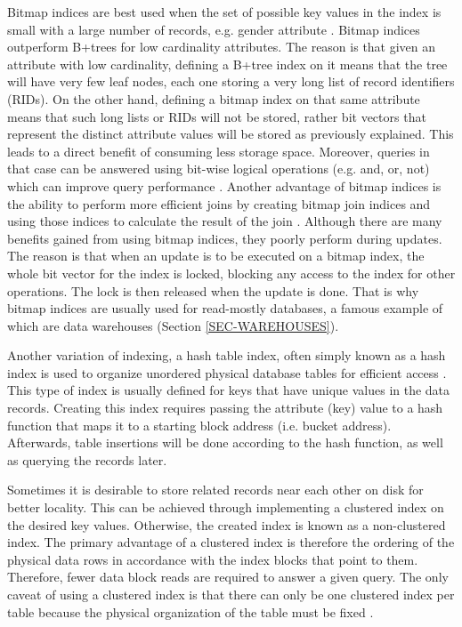 \documentclass[12pt,a4paper]{article}
\begin{document}
Bitmap indices are best used when the set of possible key values in the index is small with a large number of records, e.g. gender attribute
\cite{oneil1995multi}. Bitmap indices outperform B+trees for low cardinality attributes. The reason is that given an attribute with low cardinality, defining a
B+tree index
on it means that the tree will have very few leaf nodes, each one storing a very long list of record identifiers (RIDs). On the other hand, defining a
bitmap index on that same attribute means that such long lists or RIDs will not be stored, rather bit vectors that represent the distinct attribute values will
be stored as previously explained. This leads to a direct benefit of consuming less storage space. Moreover, queries in that case can be answered using bit-wise
logical operations (e.g. and, or, not) which can improve query performance \cite{oneil1997improved}. Another advantage of bitmap indices is the ability to
perform more
efficient joins by creating bitmap join indices and using those indices to calculate the result of the join \cite{oneil1995multi}. Although there are many
benefits
gained from using bitmap indices, they poorly perform during updates. The reason is that when an update is to be executed on a bitmap index, the whole bit
vector
for the index is locked, blocking any access to the index for other operations. The lock is then released when the update is done. That is why bitmap indices
are usually used for read-mostly databases, a famous example of which are data warehouses (Section \ref{SEC-WAREHOUSES}).

Another variation of indexing, a hash table index, often simply known as a hash index is used to organize unordered physical database tables for efficient
access \cite{lightstone2007physical}. This type of index is usually defined for keys that have unique values in the data records. Creating this index requires
passing the attribute (key) value to a hash function that maps it to a starting block address (i.e. bucket address). Afterwards, table insertions will be done
according to the hash function, as well as querying the records later.

Sometimes it is desirable to store related records near each other on disk for better locality. This can be achieved through implementing a clustered index on
the desired key values.
Otherwise, the created index is known as a non-clustered index. The primary advantage of a clustered index is therefore the ordering of the physical data rows
in accordance with the index blocks that point to them. Therefore, fewer data block reads are required to answer a given query. The only caveat of using a
clustered index is that there can only be one clustered index per table because the physical organization of the table must be fixed
\cite{lightstone2007physical}.
\end{document}
